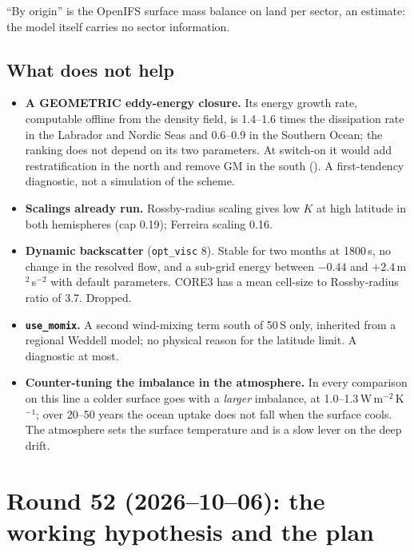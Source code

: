 \documentclass[10pt]{article}
\begin{document}
``By origin'' is the OpenIFS surface mass balance on land per sector, an estimate: the model itself
carries no sector information.

\subsection{What does not help}\label{sub:r51not}

\begin{itemize}\itemsep2pt
\item \textbf{A GEOMETRIC eddy-energy closure.} Its energy growth rate, computable offline from the
density field, is 1.4--1.6 times the dissipation rate in the Labrador and Nordic Seas and 0.6--0.9 in
the Southern Ocean; the ranking does not depend on its two parameters. At switch-on it would add
restratification in the north and remove GM in the south ().
A first-tendency diagnostic, not a simulation of the scheme.
\item \textbf{Scalings already run.} Rossby-radius scaling gives low $K$ at high latitude in both
hemispheres (cap 0.19); Ferreira scaling 0.16.
\item \textbf{Dynamic backscatter} (\texttt{opt\_visc} 8). Stable for two months at 1800\,s, no change
in the resolved flow, and a sub-grid energy between $-0.44$ and $+2.4$\,m$^2$\,s$^{-2}$ with default
parameters. CORE3 has a mean cell-size to Rossby-radius ratio of 3.7. Dropped.
\item \textbf{\texttt{use\_momix}.} A second wind-mixing term south of 50\,S only, inherited from a
regional Weddell model; no physical reason for the latitude limit. A diagnostic at most.
\item \textbf{Counter-tuning the imbalance in the atmosphere.} In every comparison on this line a
colder surface goes with a \emph{larger} imbalance, at 1.0--1.3\,W\,m$^{-2}$\,K$^{-1}$; over 20--50
years the ocean uptake does not fall when the surface cools. The atmosphere sets the surface
temperature and is a slow lever on the deep drift.
\end{itemize}

\section{Round 52 (2026--10--06): the working hypothesis and the plan}\label{sec:round52}
\end{document}
